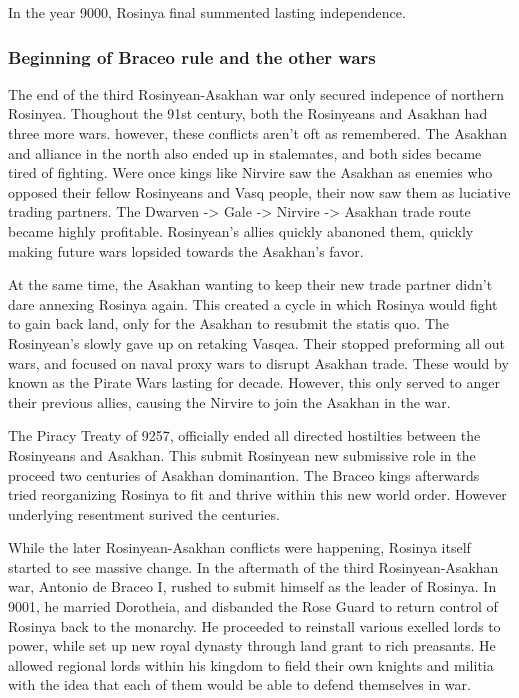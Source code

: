 \documentclass[../main.tex]{subfiles}
\begin{document}
In the year 9000, Rosinya final summented lasting independence. 

\subsubsection{Beginning of Braceo rule and the other wars}
The end of the third Rosinyean-Asakhan war only secured indepence of northern Rosinyea. Thoughout the 91st century,
both the Rosinyeans and Asakhan had three more wars. however, these conflicts aren't oft as remembered. The Asakhan
and alliance in the north also ended up in stalemates, and both sides became tired of fighting. Were once kings like 
Nirvire saw the Asakhan as enemies who opposed their fellow Rosinyeans and Vasq people, their now saw them as
luciative trading partners. The Dwarven -> Gale -> Nirvire -> Asakhan trade route became highly profitable. 
Rosinyean's allies quickly abanoned them, quickly making future wars lopsided towards the Asakhan's favor.

At the same time, the Asakhan wanting to keep their new trade partner didn't dare annexing Rosinya again. This 
created a cycle in which Rosinya would fight to gain back land, only for the Asakhan to resubmit the statis quo. 
The Rosinyean's slowly gave up on retaking Vasqea. Their stopped preforming all out wars, and focused on naval
proxy wars to disrupt Asakhan trade. These would by known as the Pirate Wars lasting for decade. However, this 
only served to anger their previous allies, causing the Nirvire to join the Asakhan in the war.

The Piracy Treaty of 9257, officially ended all directed hostilties between the Rosinyeans and Asakhan. This submit
Rosinyean new submissive role in the proceed two centuries of Asakhan dominantion. The Braceo kings afterwards tried 
reorganizing Rosinya to fit and thrive within this new world order. However underlying resentment surived the centuries.

While the later Rosinyean-Asakhan conflicts were happening, Rosinya itself started to see massive change. In 
the aftermath of the third Rosinyean-Asakhan war, Antonio de Braceo I, rushed to submit himself as the leader 
of Rosinya. In 9001, he married Dorotheia, and disbanded the Rose Guard to return control of Rosinya back to
the monarchy. He proceeded to reinstall various exelled lords to power, while set up new royal dynasty through
land grant to rich preasants. He allowed regional lords within his kingdom to field their own knights and militia
with the idea that each of them would be able to defend themselves in war. 
\end{document}
